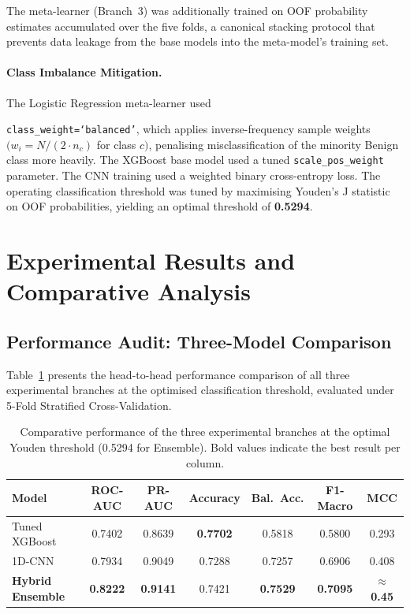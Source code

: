 \documentclass[12pt,a4paper]{article}
\begin{document}
The meta-learner (Branch~3) was additionally trained on OOF probability
estimates accumulated over the five folds, a canonical stacking protocol
that prevents data leakage from the base models into the meta-model's
training set.

\paragraph{Class Imbalance Mitigation.}
The Logistic Regression meta-learner used

\texttt{class\_weight=`balanced'}, which applies inverse-frequency sample
weights $(w_i = N / (2 \cdot n_c)$ for class $c)$, penalising
misclassification of the minority Benign class more heavily. The XGBoost
base model used a tuned \texttt{scale\_pos\_weight} parameter. The CNN
training used a weighted binary cross-entropy loss. The operating
classification threshold was tuned by maximising Youden's J statistic on
OOF probabilities, yielding an optimal threshold of \textbf{0.5294}.

\section{Experimental Results and Comparative Analysis}
\label{sec:results}

\subsection{Performance Audit: Three-Model Comparison}
\label{subsec:performance}

Table~\ref{tab:perf} presents the head-to-head performance comparison of
all three experimental branches at the optimised classification threshold,
evaluated under 5-Fold Stratified Cross-Validation.

\begin{table}[H]
\centering
\caption{Comparative performance of the three experimental branches at
         the optimal Youden threshold (0.5294 for Ensemble).
         Bold values indicate the best result per column.}
\label{tab:perf}
\begin{tabular}{@{}lcccccc@{}}
\toprule
\textbf{Model} & \textbf{ROC-AUC} & \textbf{PR-AUC} & \textbf{Accuracy}
  & \textbf{Bal.\ Acc.} & \textbf{F1-Macro} & \textbf{MCC} \\
\midrule
Tuned XGBoost
  & 0.7402 & 0.8639 & \textbf{0.7702} & 0.5818 & 0.5800 & 0.293 \\
1D-CNN
  & 0.7934 & 0.9049 & 0.7288 & 0.7257 & 0.6906 & 0.408 \\
\textbf{Hybrid Ensemble}
  & \textbf{0.8222} & \textbf{0.9141} & 0.7421
  & \textbf{0.7529} & \textbf{0.7095} & \textbf{$\approx$0.45} \\
\bottomrule
\end{tabular}
\end{table}
\end{document}
